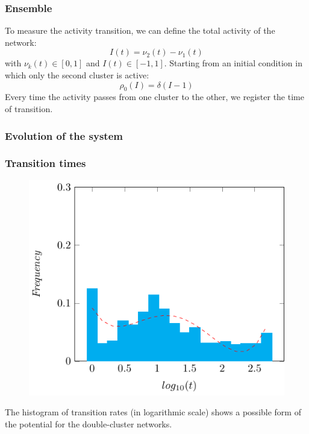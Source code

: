 \documentclass{beamer}
\begin{document}
\begin{frame}
\frametitle{Ensemble}
To measure the activity transition, we can define the total activity of the network:
$$
I(t) = \nu_2(t) - \nu_1(t)
$$
with $\nu_k(t) \in [0,1]$ and $I(t) \in [-1,1]$.
Starting from an initial condition in which only the second  cluster is active:
$$
\rho_0(I) = \delta(I-1)
$$
Every time the activity passes from one cluster to the other, we register the time of transition.
\end{frame}

\begin{frame}
\frametitle{Evolution of the system}
\begin{figure}
\centering
{}
\end{figure}
\end{frame}

\begin{frame}
\frametitle{Transition times}

\begin{figure}
\includegraphics[scale=0.8]{images/fittimes.pdf}
\end{figure}

The histogram of transition rates (in logarithmic scale) shows a possible form of the potential for the double-cluster networks.
\end{frame}
\end{document}
